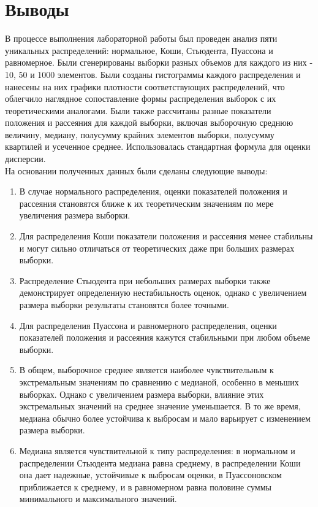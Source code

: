 \documentclass[12pt,a4paper]{article}
\begin{document}
	\section{Выводы}

	В процессе выполнения лабораторной работы был проведен анализ пяти уникальных распределений: нормальное, Коши, Стьюдента, Пуассона и равномерное.
	Были сгенерированы выборки разных объемов для каждого из них - 10, 50 и 1000 элементов.
	Были созданы гистограммы каждого распределения и нанесены на них графики плотности соответствующих распределений, что облегчило наглядное сопоставление формы распределения выборок с их теоретическими аналогами.
	Были также рассчитаны разные показатели положения и рассеяния для каждой выборки, включая выборочную среднюю величину, медиану, полусумму крайних элементов выборки, полусумму квартилей и усеченное среднее.
	Использовалась стандартная формула для оценки дисперсии. \\

	На основании полученных данных были сделаны следующие выводы:

	\begin{enumerate}
		\item В случае нормального распределения, оценки показателей положения и рассеяния становятся ближе к их теоретическим значениям по мере увеличения размера выборки.
		\item Для распределения Коши показатели положения и рассеяния менее стабильны и могут сильно отличаться от теоретических даже при больших размерах выборки.
		\item Распределение Стьюдента при небольших размерах выборки также демонстрирует определенную нестабильность оценок, однако с увеличением размера выборки результаты становятся более точными.
		\item Для распределения Пуассона и равномерного распределения, оценки показателей положения и рассеяния кажутся стабильными при любом объеме выборки.
		\item В общем, выборочное среднее является наиболее чувствительным к экстремальным значениям по сравнению с медианой, особенно в меньших выборках. Однако с увеличением размера выборки, влияние этих экстремальных значений на среднее значение уменьшается. В то же время, медиана обычно более устойчива к выбросам и мало варьирует с изменением размера выборки.
		\item Медиана является чувствительной к типу распределения: в нормальном и распределении Стьюдента медиана равна среднему, в распределении Коши она дает надежные, устойчивые к выбросам оценки, в Пуассоновском приближается к среднему, и в равномерном равна половине суммы минимального и максимального значений.
	\end{enumerate}
\end{document}
